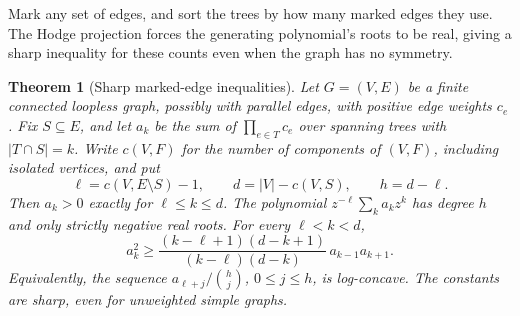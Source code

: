 \documentclass[11pt]{article}
\newtheorem{theorem}{Theorem}[section]
\theoremstyle{definition}
\theoremstyle{remark}
\begin{document}
Mark any set of edges, and sort the trees by how many marked edges they use.
The Hodge projection forces the generating polynomial's roots to be real,
giving a sharp inequality for these counts even when the graph has no symmetry.

\begin{theorem}[Sharp marked-edge inequalities]
\label{thm:marked-tree-inequality}
Let $G=(V,E)$ be a finite connected loopless graph, possibly with parallel
edges, with positive edge weights $c_e$.  Fix $S\subseteq E$, and let $a_k$
be the sum of $\prod_{e\in T}c_e$ over spanning trees with $|T\cap S|=k$.
Write $c(V,F)$ for the number of components of $(V,F)$, including isolated
vertices, and put
\[
 \ell=c(V,E\setminus S)-1,\qquad d=|V|-c(V,S),\qquad h=d-\ell.
\]
Then $a_k>0$ exactly for $\ell\le k\le d$.  The polynomial
$z^{-\ell}\sum_k a_kz^k$ has degree $h$ and only strictly negative real
roots.  For every $\ell<k<d$,
\begin{equation}\label{eq:marked-tree-newton}
 a_k^2\ge
 \frac{(k-\ell+1)(d-k+1)}{(k-\ell)(d-k)}\,a_{k-1}a_{k+1}.
\end{equation}
Equivalently, the sequence $a_{\ell+j}/\binom hj$, $0\le j\le h$, is
log-concave.  The constants are sharp, even for unweighted simple graphs.
\end{theorem}
\end{document}
